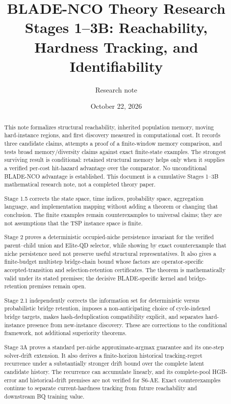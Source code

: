 \documentclass[11pt]{article}
\title{BLADE-NCO Theory Research\\Stages 1--3B: Reachability, Hardness Tracking, and Identifiability}
\author{Research note}
\date{October 22, 2026}
\begin{document}
\maketitle

\begin{abstract}
This note formalizes structural reachability, inherited population memory, moving hard-instance regions, and first discovery measured in computational cost. It records three candidate claims, attempts a proof of a finite-window memory comparison, and tests broad memory/diversity claims against exact finite-state examples. The strongest surviving result is conditional: retained structural memory helps only when it supplies a verified per-cost hit-hazard advantage over the comparator. No unconditional BLADE-NCO advantage is established. This document is a cumulative Stages 1--3B mathematical research note, not a completed theory paper.

Stage 1.5 corrects the state space, time indices, probability space,
aggregation language, and implementation mapping without adding a theorem or
changing that conclusion. The finite examples remain counterexamples to
universal claims; they are not assumptions that the TSP instance space is
finite.

Stage 2 proves a deterministic occupied-niche persistence invariant for the
verified parent--child union and Elite-QD selector, while showing by exact
counterexample that niche persistence need not preserve useful structural
representatives. It also gives a finite-budget multistep bridge-chain bound
whose factors are operator-specific accepted-transition and selection-retention
certificates. The theorem is mathematically valid under its stated premises;
the decisive BLADE-specific kernel and bridge-retention premises remain open.

Stage 2.1 independently corrects the information set for deterministic versus
probabilistic bridge retention, imposes a non-anticipating choice of
cycle-indexed bridge targets, makes hash-deduplication compatibility explicit,
and separates hard-instance presence from new-instance discovery. These are
corrections to the conditional framework, not additional superiority theorems.

Stage 3A proves a standard per-niche approximate-argmax guarantee and its
one-step solver-drift extension. It also derives a finite-horizon historical
tracking-regret recurrence under a substantially stronger drift bound over
the complete latent candidate history. The recurrence can accumulate linearly,
and its complete-pool HGB-error and historical-drift premises are not verified
for S6-AE. Exact counterexamples continue to separate current-hardness tracking
from future reachability and downstream BQ training value.


\end{abstract}
\end{document}
